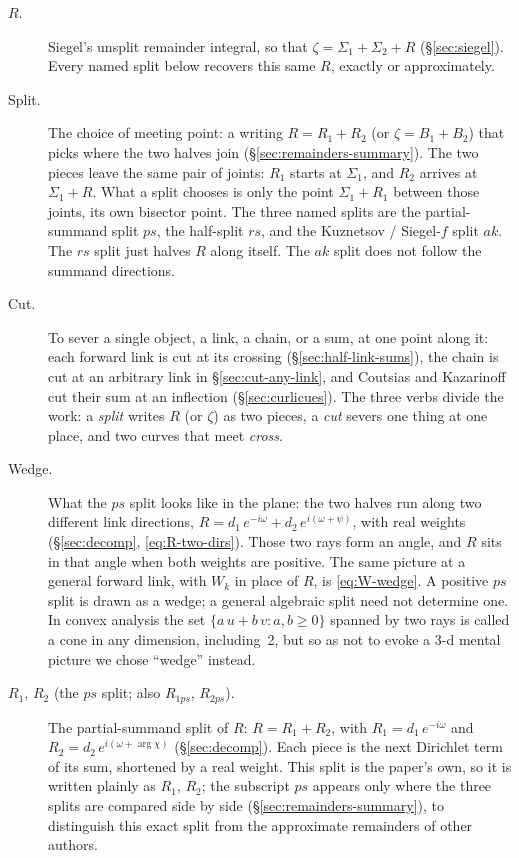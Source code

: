\documentclass[11pt]{article}
\theoremstyle{definition}
\begin{document}
\begin{description}
\item[$R$.]
Siegel's unsplit remainder integral, so that
$\zeta=\Sigma_1+\Sigma_2+R$ (\S\ref{sec:siegel}).
Every named split below recovers this same $R$, exactly or
approximately.

\item[Split.]
The choice of meeting point: a writing
$R=R_1+R_2$ (or $\zeta=B_1+B_2$) that picks where the two
halves join
(\S\ref{sec:remainders-summary}).
The two pieces leave the same pair of joints: $R_1$ starts at
$\Sigma_1$, and $R_2$ arrives at $\Sigma_1+R$. What a split
chooses is only the point $\Sigma_1+R_1$ between those joints,
its own bisector point. The three named splits are the
partial-summand split $ps$, the half-split $rs$, and the
Kuznetsov / Siegel-$f$ split $ak$. The $rs$ split just halves
$R$ along itself. The $ak$ split does not follow the summand
directions.

\item[Cut.]
To sever a single object, a link, a chain, or a sum, at one point
along it: each forward link is cut at its crossing
(\S\ref{sec:half-link-sums}), the chain is cut at an arbitrary
link in \S\ref{sec:cut-any-link}, and Coutsias and Kazarinoff cut
their sum at an inflection (\S\ref{sec:curlicues}).
The three verbs divide the work: a \emph{split} writes $R$ (or
$\zeta$) as two pieces, a \emph{cut} severs one thing at one
place, and two curves that meet \emph{cross}.

\item[Wedge.]
What the $ps$ split looks like in the plane: the two halves run
along two different link directions,
$R=d_1\,e^{-i\omega}+d_2\,e^{i(\omega+\psi)}$, with real weights
(\S\ref{sec:decomp}, \eqref{eq:R-two-dirs}).
Those two rays form an angle, and $R$ sits in that angle when
both weights are positive. The same picture at a general forward
link, with $W_k$ in place of $R$, is \eqref{eq:W-wedge}.
A positive $ps$ split is drawn as a wedge; a general algebraic split
need not determine one.
In convex analysis the set $\{a\,u+b\,v : a,b\ge0\}$ spanned by
two rays is called a cone in any dimension, including~2, but so
as not to evoke a 3-d mental picture we chose ``wedge'' instead.

\item[$R_{1}$, $R_{2}$ (the $ps$ split; also $R_{1ps}$, $R_{2ps}$).]
The partial-summand split of $R$:
$R=R_{1}+R_{2}$, with
$R_{1}=d_1\,e^{-i\omega}$ and
$R_{2}=d_2\,e^{i(\omega+\arg\chi)}$
(\S\ref{sec:decomp}).
Each piece is the next Dirichlet term of its sum, shortened by a
real weight.
This split is the paper's own, so it is written plainly as
$R_1$, $R_2$; the subscript $ps$ appears only where the three
splits are compared side by side
(\S\ref{sec:remainders-summary}), to distinguish this exact split
from the approximate remainders of other authors.


\end{description}
\end{document}
